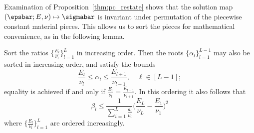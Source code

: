 \documentclass[letterpaper,11pt]{article}
\begin{document}
Examination of Proposition~\ref{thm:pc_restate} shows that
the solution map $(\epsbar; E, \nu) \mapsto \sigmabar$ is invariant under permutation
of the piecewise constant material pieces. This allows us to sort the pieces for mathematical convenience, as in the following lemma.

\begin{lemma}\label{lemma:pc_bound}
    Sort the ratios $\{\frac{E_l}{\nu_l}\}_{l=1}^L$ in increasing order.
    Then the roots $\{\alpha_l\}_{l=1}^{L-1}$ may also be sorted in increasing order, and satisfy the bounds
    \begin{equation}
        \frac{E_l}{\nu_l} \leq \alpha_l \leq \frac{E_{l+1}}{\nu_{l+1}}, \quad \ell \in [L-1];
    \end{equation}
equality is achieved if and only if $\frac{E_l}{\nu_l} = \frac{E_{l+1}}{\nu_{l+1}}$.
In this ordering it also follows that
    \begin{equation}
    \label{eq:ub}
        \beta_l \leq \frac{1}{\sum_{i=1}^L\frac{d_i}{\nu_i}}\Big(\frac{E_L}{\nu_L} - \frac{E_1}{\nu_1}\Big)^2
    \end{equation}
    where $\{\frac{E_l}{\nu_l}\}_{l=1}^L$ are ordered increasingly.
\end{lemma}
\end{document}
